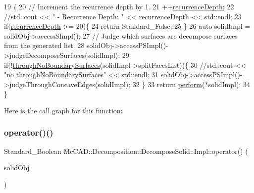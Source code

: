 \begin{DoxyCode}
19                                                  \{
20     \textcolor{comment}{// Increment the recurrence depth by 1.}
21     ++\hyperlink{classMcCAD_1_1Decomposition_1_1DecomposeSolid_1_1Impl_ad908b2687b52f636d8368b814aa5f770}{recurrenceDepth};
22     \textcolor{comment}{//std::cout << "     - Recurrence Depth: " << recurrenceDepth << std::endl;}
23     \textcolor{keywordflow}{if}(\hyperlink{classMcCAD_1_1Decomposition_1_1DecomposeSolid_1_1Impl_ad908b2687b52f636d8368b814aa5f770}{recurrenceDepth} >= 20)\{
24         \textcolor{keywordflow}{return} Standard\_False;
25     \}
26     \textcolor{keyword}{auto} solidImpl = solidObj->accessSImpl();
27     \textcolor{comment}{// Judge which surfaces are decompose surfaces from the generated list.}
28     solidObj->accessPSImpl()->judgeDecomposeSurfaces(solidImpl);
29     \textcolor{keywordflow}{if}(!\hyperlink{classMcCAD_1_1Decomposition_1_1DecomposeSolid_1_1Impl_aade70e5860e8ee29ff8f9e4c4cfc53b9}{throughNoBoundarySurfaces}(solidImpl->splitFacesList))\{
30         \textcolor{comment}{//std::cout << "no throughNoBoundarySurfaces" << std::endl;}
31         solidObj->accessPSImpl()->judgeThroughConcaveEdges(solidImpl);
32     \}
33      \textcolor{keywordflow}{return} \hyperlink{classMcCAD_1_1Decomposition_1_1DecomposeSolid_1_1Impl_aa65d0c829adf71764f3d1954cd8d6829}{perform}(*solidImpl);
34 \}
\end{DoxyCode}
Here is the call graph for this function\+:
\mbox{\label{classMcCAD_1_1Decomposition_1_1DecomposeSolid_1_1Impl_a72113129aea63c20631338a8f5d4022b}} 
\subsubsection{\texorpdfstring{operator()()}{operator()()}\hspace{0.1cm}{\footnotesize\ttfamily [2/6]}}
{\footnotesize\ttfamily Standard\+\_\+\+Boolean Mc\+C\+A\+D\+::\+Decomposition\+::\+Decompose\+Solid\+::\+Impl\+::operator() (\begin{DoxyParamCaption}\item[{std\+::shared\+\_\+ptr$<$ \hyperlink{classMcCAD_1_1Geometry_1_1PLSolid}{Geometry\+::\+P\+L\+Solid} $>$ \&}]{solid\+Obj }\end{DoxyParamCaption})}

